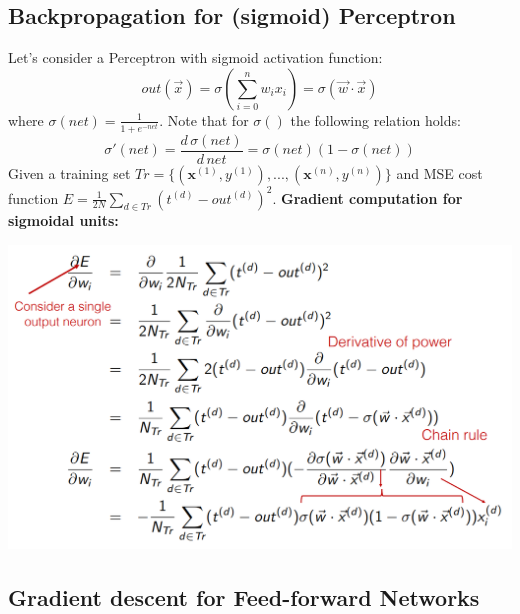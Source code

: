 \subsection{Backpropagation for (sigmoid) Perceptron}
Let's consider a Perceptron with sigmoid activation function:
\[out(\Vec{x}) = \sigma\left(\sum_{i=0}^{n} w_i x_i \right) = \sigma(\Vec{w} \cdot \Vec{x})\]
where $\sigma(net) = \frac{1}{1 + e^{-net}}$. Note that for $\sigma()$ the following relation holds:
\[\sigma'(net) = \frac{d \, \sigma(net)}{d \, net} = \sigma(net)(1 - \sigma(net))\]
Given a training set $Tr = \{(\textbf{x}^{(1)}, y^{(1)}), ..., (\textbf{x}^{(n)}, y^{(n)})\}$ and MSE cost function $E = \frac{1}{2N}\sum_{d \in Tr}(t^{(d)} - out^{(d)})^{2}$.\newline\newline
\textbf{Gradient computation for sigmoidal units:}
\begin{center}
    \includegraphics[scale = 0.5]{images/Derivation.png}
\end{center}

\subsection{Gradient descent for Feed-forward Networks}

